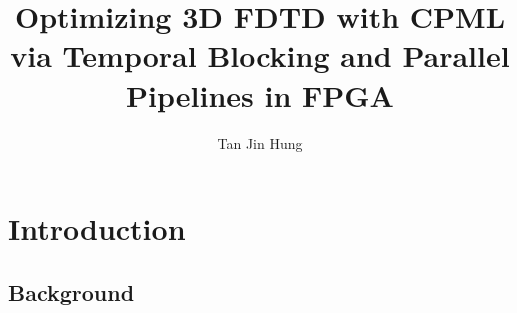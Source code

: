 \documentclass[12pt,a4paper,draft,twocolumns]{article}
\begin{document}
\title{Optimizing 3D FDTD with CPML via Temporal Blocking and Parallel Pipelines in FPGA}
\author{Tan Jin Hung}
\maketitle

\begin{abstract}
\end{abstract}

\section{Introduction}
\subsection{Background}
\end{document}

